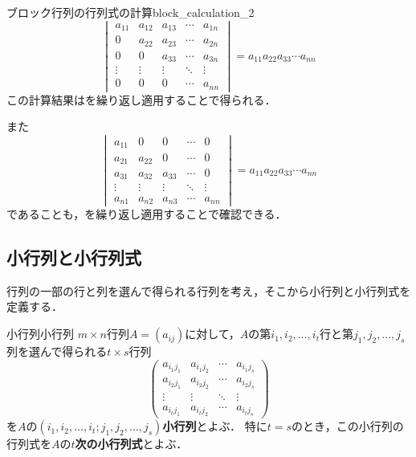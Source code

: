 \begin{example}{ブロック行列の行列式の計算}{block_calculation_2}
  \[
  \begin{vmatrix} 
    a_{11} & a_{12} & a_{13} & \cdots & a_{1n} \\
    0      & a_{22} & a_{23} & \cdots & a_{2n} \\
    0      & 0      & a_{33} & \cdots & a_{3n} \\
    \vdots & \vdots & \vdots & \ddots & \vdots \\
    0      & 0      & 0      & \cdots & a_{nn}
  \end{vmatrix}
  =
  a_{11}a_{22}a_{33}\cdots a_{nn}
  \]
  この計算結果はを繰り返し適用することで得られる．

  また
  \[
  \begin{vmatrix}
  a_{11} & 0     & 0      & \cdots & 0      \\
  a_{21} & a_{22} & 0      & \cdots & 0      \\
  a_{31} & a_{32} & a_{33} & \cdots & 0      \\
  \vdots & \vdots & \vdots & \ddots & \vdots \\
  a_{n1} & a_{n2} & a_{n3} & \cdots & a_{nn}
  \end{vmatrix}
  = a_{11}a_{22}a_{33}\cdots a_{nn}
  \]
  であることも，を繰り返し適用することで確認できる．
\end{example}

\subsection{小行列と小行列式}

行列の一部の行と列を選んで得られる行列を考え，そこから小行列と小行列式を定義する．


\begin{definition}{小行列}{小行列}
  $m \times n$行列$A=(a_{ij})$に対して，$A$の第$i_1,i_2,\dots,i_t$行と第$j_1,j_2,\dots,j_s$列を選んで得られる$t \times s$行列
  \[
  \begin{pmatrix}
  a_{i_1 j_1} & a_{i_1 j_2} & \cdots & a_{i_1 j_s} \\
  a_{i_2 j_1} & a_{i_2 j_2} & \cdots & a_{i_2 j_s} \\
  \vdots      & \vdots      & \ddots & \vdots      \\
  a_{i_t j_1} & a_{i_t j_2} & \cdots & a_{i_t j_s}
  \end{pmatrix}
  \]
  を$A$の\textbf{$(i_1,i_2,\dots,i_t ; j_1,j_2,\dots,j_s)$小行列}とよぶ．
  特に$t=s$のとき，この小行列の行列式を$A$の\textbf{$t$次の小行列式}とよぶ．
\end{definition}

